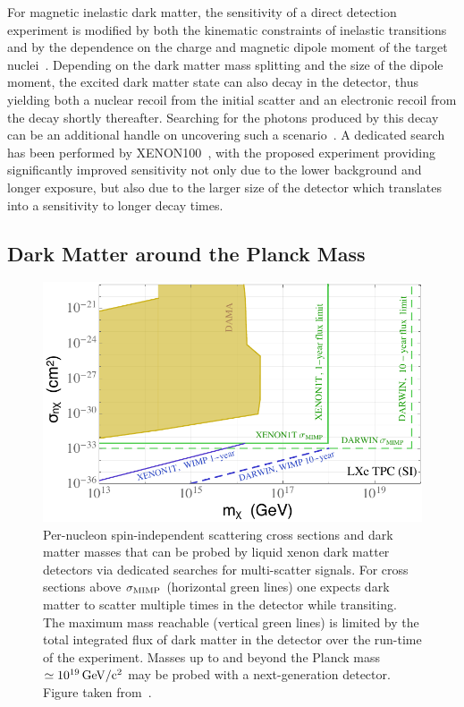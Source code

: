 For magnetic inelastic dark matter, the sensitivity of a direct detection experiment is modified by both the kinematic constraints of inelastic transitions and by the dependence on the charge and magnetic dipole moment of the target nuclei~\cite{Chang:2010en}. Depending on the dark matter mass splitting and the size of the dipole moment, the excited dark matter state can also decay in the detector, thus yielding both a nuclear recoil from the initial scatter and an electronic recoil from the decay shortly thereafter. Searching for the photons produced by this decay can be an additional handle on uncovering such a scenario~\cite{Lin:2010sb, Pospelov:2013nea}. A dedicated search has been performed by XENON100~\cite{Aprile:2017kek}, with the proposed experiment providing significantly improved sensitivity not only due to the lower background and longer exposure, but also due to the larger size of the detector which translates into a sensitivity to longer decay times.

\subsection{Dark Matter around the Planck Mass} \label{sec:planck}

\begin{figure}[!htbp]  
\begin{center}
\includegraphics[width=0.99\columnwidth]{fig_multiscatter_SI.pdf}
\caption{Per-nucleon spin-independent scattering cross sections and dark matter masses that can be probed by liquid xenon dark matter detectors via dedicated searches for multi-scatter signals. For cross sections above $\sigma_{\rm MIMP}$ (horizontal green lines) one expects dark matter to scatter multiple times in the detector while transiting. The maximum mass reachable (vertical green lines) is limited by the total integrated flux of dark matter in the detector over the run-time of the experiment. Masses up to and beyond the Planck mass $\simeq 10^{19}\, \mathrm{GeV/c^2}$ may be probed with a next-generation detector. Figure taken from~\cite{Bramante:2018qbc}.}
\label{fig:multiscatter_SI}
\end{center} 
\end{figure}

